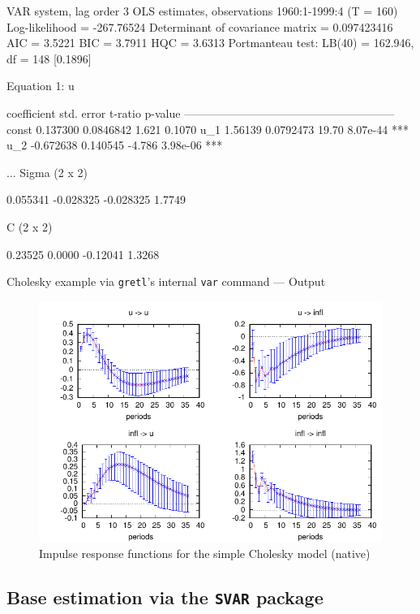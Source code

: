 \documentclass[a4paper,10pt]{article}
\begin{document}
\begin{table}[htbp]
  \centering
  \begin{scode}
VAR system, lag order 3
OLS estimates, observations 1960:1-1999:4 (T = 160)
Log-likelihood = -267.76524
Determinant of covariance matrix = 0.097423416
AIC = 3.5221
BIC = 3.7911
HQC = 3.6313
Portmanteau test: LB(40) = 162.946, df = 148 [0.1896]

Equation 1: u

             coefficient   std. error   t-ratio   p-value 
  --------------------------------------------------------
  const       0.137300     0.0846842     1.621    0.1070  
  u_1         1.56139      0.0792473    19.70     8.07e-44 ***
  u_2        -0.672638     0.140545     -4.786    3.98e-06 ***

...
Sigma (2 x 2)

    0.055341    -0.028325 
   -0.028325       1.7749 

C (2 x 2)

     0.23525       0.0000 
    -0.12041       1.3268 
  \end{scode}
  \caption{Cholesky example via \texttt{gretl}'s internal 
  \texttt{var} command --- Output}
   \label{InternalChol-out}
\end{table}

\begin{figure}[htbp]
  \centering
  \includegraphics{simpleC_gretl}
  \caption{Impulse response functions for the simple Cholesky model (native)}
  \label{fig:nativeIRF}
\end{figure}


\subsection{Base estimation via the \texttt{SVAR} package}
\label{sec:baseest}
\end{document}
